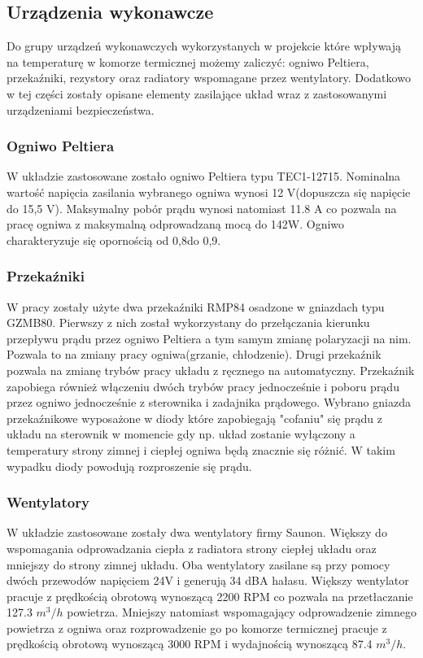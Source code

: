 \documentclass[oneside]{mgr}
\begin{document}
\subsection{Urządzenia wykonawcze}

Do grupy urządzeń wykonawczych wykorzystanych w projekcie które wpływają na temperaturę w komorze termicznej możemy zaliczyć: ogniwo Peltiera, przekaźniki, rezystory oraz radiatory wspomagane przez wentylatory. Dodatkowo w tej części zostały opisane elementy zasilające układ wraz z zastosowanymi urządzeniami bezpieczeństwa.
\subsubsection{Ogniwo Peltiera}
W układzie zastosowane zostało ogniwo Peltiera typu TEC1-12715. Nominalna wartość napięcia zasilania wybranego ogniwa wynosi 12 V(dopuszcza się napięcie do 15,5 V). Maksymalny pobór prądu wynosi natomiast 11.8 A co pozwala na pracę ogniwa z maksymalną odprowadzaną mocą do 142W. Ogniwo charakteryzuje się opornością od 0,8\ohm do 0,9\ohm.
\subsubsection{Przekaźniki}
W pracy zostały użyte dwa przekaźniki RMP84 osadzone w gniazdach typu GZMB80. Pierwszy z nich został wykorzystany do przełączania kierunku przepływu prądu przez ogniwo Peltiera a tym samym zmianę polaryzacji na nim. Pozwala to na zmiany pracy ogniwa(grzanie, chłodzenie). Drugi przekaźnik pozwala na zmianę trybów pracy układu z ręcznego na automatyczny. Przekaźnik zapobiega również włączeniu dwóch trybów pracy jednocześnie i poboru prądu przez ogniwo jednocześnie z sterownika i zadajnika prądowego. Wybrano gniazda przekaźnikowe wyposażone w diody które zapobiegają "cofaniu" się prądu z układu na sterownik w momencie gdy np. układ zostanie wyłączony a temperatury strony zimnej i ciepłej ogniwa będą znacznie się różnić. W takim wypadku diody powodują rozproszenie się prądu.
\subsubsection{Wentylatory}
W układzie zastosowane zostały dwa wentylatory firmy Saunon. Większy do wspomagania odprowadzania ciepła z radiatora strony ciepłej układu oraz mniejszy do strony zimnej układu. Oba wentylatory zasilane są przy pomocy dwóch przewodów napięciem 24V i generują 34 dBA hałasu. Większy wentylator pracuje z prędkością obrotową wynoszącą 2200 RPM co pozwala na przetłaczanie 127.3 $m^3/h$ powietrza. Mniejszy natomiast wspomagający odprowadzenie zimnego powietrza z ogniwa oraz rozprowadzenie go po komorze termicznej pracuje z prędkością obrotową wynoszącą 3000 RPM i wydajnością wynoszącą 87.4 $m^3/h$.
\end{document}

